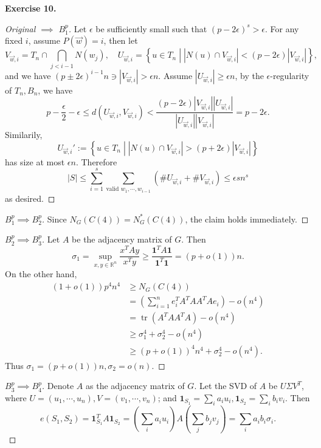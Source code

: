 \documentclass[a4paper]{article}
\newtheorem*{proof}{Proof}
\newenvironment{exercise}[1]{
	\par
	\noindent\textbf{Exercise #1.}\quad
}{
	\par
	\bigskip
}
\DeclareMathOperator{\tr}{\mathrm{tr}}
\newcommand{\abs}[1]{\left| #1 \right|}
\newcommand{\pbra}[1]{\left( #1 \right)}
\newcommand{\cbra}[1]{\left\{ #1 \right\}}
\newcommand{\Rbb}{\mathbb{R}}
\begin{document}
\begin{exercise}{10}
\begin{proof}[Original $\implies$ $B_1^p$]
        Let $\epsilon$ be sufficiently small such that $(p-2\epsilon)^s>\epsilon$.
        For any fixed $i$, assume $P(\vec w)=i$, then let
        $$
        V_{\vec w,i}=T_n\cap\bigcap_{j<i-1}N(w_j),\quad 
        U_{\vec w,i}=\cbra{u\in T_n\middle|\abs{N(u)\cap V_{\vec w,i}}<(p-2\epsilon)|V_{\vec w,i}|},
        $$
        and we have $(p\pm2\epsilon)^{i-1}n\ni|V_{\vec w,i}|>\epsilon n$.
        Assume $|U_{\vec w,i}|\geq\epsilon n$, by the $\epsilon$-regularity of $T_n,B_n$, we have
        $$
        p-\frac\epsilon2-\epsilon\leq d(U_{\vec w,i},V_{\vec w,i})<\frac{(p-2\epsilon)|V_{\vec w,i}||U_{\vec w,i}|}
        {|U_{\vec w,i}||V_{\vec w,i}|}=p-2\epsilon.
        $$
        Similarily, 
        $$
        U_{\vec w,i}':=\cbra{u\in T_n\middle|\abs{N(u)\cap V_{\vec w,i}}>(p+2\epsilon)|V_{\vec w,i}|}
        $$
        has size at most $\epsilon n$.
        Therefore
        $$
        |S|\leq\sum_{i=1}^s\sum_{\text{valid }w_1,\cdots,w_{i-1}}\pbra{\#U_{\vec w,i}+\#V_{\vec w,i}}\leq\epsilon sn^s
        $$
        as desired.
    \end{proof}
    \begin{proof}[$B_1^p\implies B_2^p$]
        Since $N_G(C(4))=N_G^*(C(4))$, the claim holds immediately.
    \end{proof}
    \begin{proof}[$B_2^p\implies B_3^p$]
        Let $A$ be the adjacency matrix of $G$. Then
        $$
        \sigma_1=\sup_{x,y\in\Rbb^n}\frac{x^TAy}{x^Ty}\geq\frac{\bm 1^TA\bm 1}{\bm 1^T\bm 1}=(p+o(1))n.
        $$
        On the other hand,
        \begin{align*}
            (1+o(1))p^4n^4
            &\geq N_G(C(4))\\
            &=\pbra{\sum_{i=1}^ne_i^TA^TAA^TAe_i}-o(n^4)\\
            &=\tr\pbra{A^TAA^TA}-o(n^4)\\
            &\geq\sigma_1^4+\sigma_2^4-o(n^4)\\
            &\geq(p+o(1))^4n^4+\sigma_2^4-o(n^4).
        \end{align*}
        Thus $\sigma_1=(p+o(1))n,\sigma_2=o(n)$.
    \end{proof}
    \begin{proof}[$B_3^p\implies B_4^p$]
        Denote $A$ as the adjacency matrix of $G$.
        Let the SVD of $A$ be $U\Sigma V^T$, where $U=(u_1,\cdots,u_n),V=(v_1,\cdots,v_n)$;
        and $\bm 1_{S_1}=\sum_ia_iu_i,\bm 1_{S_2}=\sum_ib_iv_i$.
        Then
        $$
        e(S_1,S_2)=\bm 1_{S_1}^TA\bm 1_{S_2}=\pbra{\sum_ia_iu_i}A\pbra{\sum_jb_jv_j}=\sum_ia_ib_i\sigma_i.
        $$


\end{proof}
\end{exercise}
\end{document}
